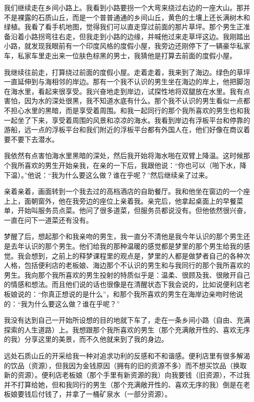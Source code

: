 我们继续走在乡间小路上。我看到小路要拐一个大弯来绕过右边的一座大山。那并不是裸露的石质山丘，而是一个普普通通的乡间山丘，黄色的土壤上还长满树木和绿植。我看了看手机地图，觉得我们可以直走穿过前面的那片草坪。那个男生正准备沿着小路拐弯往右走，但我走到小路的边缘，并喊他过来走草坪这边。我刚踏出小路，就发现我眼前有一个印度风格的度假小屋，我旁边还刚停下了一辆豪华私家车，私家车里走出来一位肤色棕黑的男士，我猜他是打算去前面的度假小屋。

我继续往前走，打算绕过前面的度假小屋。走着走着，我来到了海边。绿色的草坪一直延伸到与海相邻的岸边。那有一个我不认识的男生坐在海边的岸上，他把脚泡在海水里，看起来很享受。我兴奋地走到岸边，试探性地将双腿放在水里。我有点害怕，因为水的深处很黑，我不知道水底有什么。那个我不认识的男生看似一点都不担心水里的黑暗，而是享受着周围。和我一起同行的那个我所喜欢的男生也和我一起坐了下来，享受着周围的风景和凉凉的海水。我看到岸边有浮板平台和停靠的游船，远一点的浮板平台和我们附近的浮板平台都有外国人在，他们好像在商议着要不要下去潜水。

我依然有点害怕海水里黑暗的深处，然后我开始将海水啪在双臂上降温。这时候那个我所喜欢的男生开始亲我，在亲的一下后，我跟他说：“你也可以（啪下水，降下温）。”他说：“我为什么要这么做？谁在乎呢？”然后继续亲了过来。

亲着亲着，画面转到一个我去过的高档酒店的自助餐厅。我和他坐在窗边的一个座上上，面朝窗外，他在我旁边的座位上亲着我。亲完后，他拿起桌面上的早餐菜单，开始叫服务员点菜。他问了很多道菜，但服务员都说没有。但他依然很兴奋，一直在问下一道菜还有没有。


梦醒了后，想起那个和我亲吻的男生，我一直分不清他是我今年认识的那个男生还是去年认识的那个男生。他们给我的那种温暖的感觉都是梦里的那个男生给我的感觉。我会想到，之前上的释梦课程里的观点是，梦里的人都是做梦者自己的各种次人格，包括便利店的老板娘、海边那个不认识的男生和与我同行的那个我所喜欢的男生。我向那个我所喜欢的男生投射的特质似乎是：温柔、很顾及我、很敞开自己的情感和想法。而且他们说的话也很像是在清醒状态下我会说的，比如说便利店老板娘说的：“你真正想说的是什么”，和那个我所喜欢的男生在海岸边亲吻时他说的：“我为什么要这么做？谁在乎呢？”


我没有达到自己一开始所设想的目的地就下车了，走在一条乡间小路（自由、充满探索的人生道路）上。我想跟那个我所喜欢的男生（那个充满敞开性的、喜欢无序的我）分享这里的美景，而不久他就来到了我的身边。

远处石质山丘的开采给我一种对追求功利的反感和不和谐感。便利店里有很多解渴的饮品（资源），但我因为金钱原因（拥有的旧的资源不多）而不想买饮品（换取新的资源）。便利店老板娘（那个手里有新资源的我）向我要钱（旧资源），不过我并不打算给她，但和我同行的男生（那个充满敞开性的、喜欢无序的我）倒是在老板娘要钱后付钱了，并拿了一桶矿泉水（一部分资源）。

